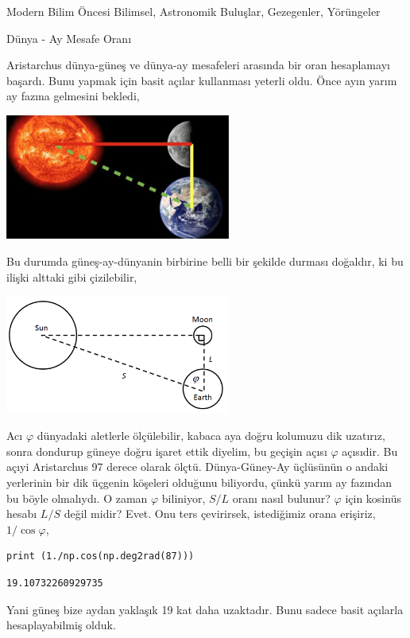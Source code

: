 \documentclass[12pt,fleqn]{article}\usepackage{../../common}
\begin{document}
Modern Bilim Öncesi Bilimsel, Astronomik Buluşlar, Gezegenler, Yörüngeler

Dünya - Ay Mesafe Oranı

Aristarchus dünya-güneş ve dünya-ay mesafeleri arasında bir oran hesaplamayı
başardı. Bunu yapmak için basit açılar kullanması yeterli oldu. Önce ayın
yarım ay fazına gelmesini bekledi, 

\includegraphics[width=20em]{moonshad.jpg}

Bu durumda güneş-ay-dünyanin birbirine belli bir şekilde durması doğaldır, ki
bu ilişki alttaki gibi çizilebilir,

\includegraphics[width=20em]{sunmoon.png}

Acı $\varphi$ dünyadaki aletlerle ölçülebilir, kabaca aya doğru kolumuzu dik
uzatırız, sonra dondurup güneye doğru işaret ettik diyelim, bu geçişin açısı
$\varphi$ açısıdir. Bu açıyi Aristarchus 97 derece olarak ölçtü. Dünya-Güney-Ay
üçlüsünün o andaki yerlerinin bir dik üçgenin köşeleri olduğunu biliyordu, çünkü
yarım ay fazından bu böyle olmalıydı. O zaman $\varphi$ biliniyor, $S/L$ oranı
nasıl bulunur? $\varphi$ için kosinüs hesabı $L/S$ değil midir?  Evet. Onu ters
çevirirsek, istediğimiz orana erişiriz, $1 / \cos\varphi$,

\begin{verbatim}
print (1./np.cos(np.deg2rad(87)))
\end{verbatim}

\begin{verbatim}
19.10732260929735
\end{verbatim}

Yani güneş bize aydan yaklaşık 19 kat daha uzaktadır. Bunu sadece basit açılarla
hesaplayabilmiş olduk.
\end{document}
